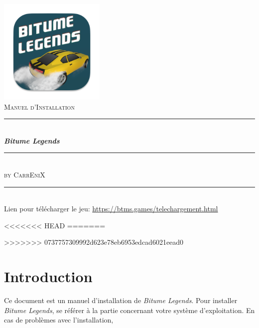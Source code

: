 \documentclass[a4paper,12pt]{article}
\newcommand{\HRule}{\rule{\linewidth}{0.5mm}}
\newcommand{\btmlgs}{\textsl{Bitume Legends}}
\newcommand{\CEX}{\textsc{CarrEniX}}
\newcommand{\report}{Manuel d'Installation}
\begin{document}
  

    \begin{titlepage}
        \begin{center}
            \includegraphics[scale=0.7]{logo192.png}\\[0.5cm]
            \textsc{\Large \report}\\[1.5cm]

            \HRule \\[0.4cm]
            { \LARGE \bfseries \btmlgs \\[0.4cm] }

            \HRule \\[2cm]
        
            \textsc{by \Large \CEX}\\[1.5cm]
        \end{center}
        \tableofcontents
        \begin{center}
            \HRule\\
            Lien pour télécharger le jeu: \url{https://btms.games/telechargement.html}
        \end{center}
    \end{titlepage}

<<<<<<< HEAD
=======
>>>>>>> 0737757309992d623e78eb6953edcad6021eead0
    \section*{Introduction}
        Ce document est un manuel d'installation de \btmlgs.
        Pour installer \btmlgs, se référer à la partie concernant votre système d'exploitation.
        En cas de problèmes avec l'installation, 
\end{document}
